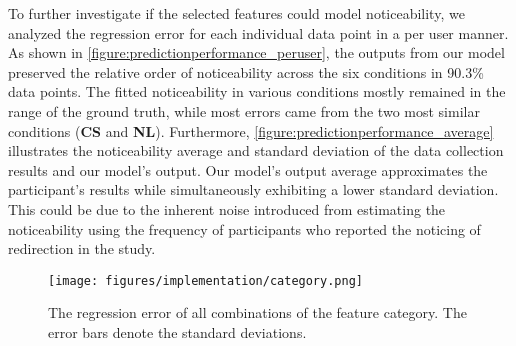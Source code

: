 To further investigate if the selected features could model noticeability, we analyzed the regression error for each individual data point in a per user manner. 
As shown in \autoref{figure:predictionperformance_peruser}, the outputs from our model preserved the relative order of noticeability across the six conditions in 90.3\% data points.
The fitted noticeability in various conditions mostly remained in the range of the ground truth, while most errors came from the two most similar conditions (\textbf{CS} and \textbf{NL}). 
Furthermore, \autoref{figure:predictionperformance_average} illustrates the noticeability average and standard deviation of the data collection results and our model's output.
Our model's output average approximates the participant's results while simultaneously exhibiting a lower standard deviation.
This could be due to the inherent noise introduced from estimating the noticeability using the frequency of participants who reported the noticing of redirection in the study.

\begin{figure}[t]
    \centering
    \texttt{[image: figures/implementation/category.png]}
    \caption{The regression error of all combinations of the feature category. The error bars denote the standard deviations.}
    \label{figure:featureselection}
\end{figure}



